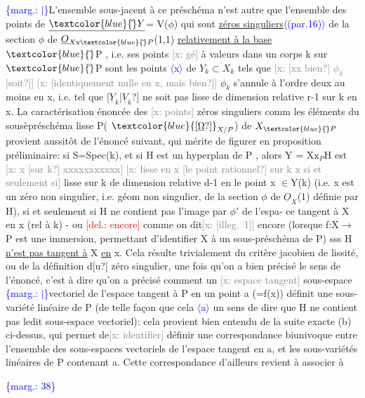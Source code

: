 \documentclass[11pt]{article}
\newcommand{\scanpage}[1]{\par\bigskip\noindent{\small\sffamily[scan #1]}\par}
\newcommand{\mspage}[1]{{\small\sffamily[p.\,#1]}}
\newcommand{\hand}[1]{\textcolor{blue}{#1}}
\newcommand{\inserted}[2][]{\textcolor{blue}{$\langle$#2$\rangle$}}
\newcommand{\margin}[1]{\textcolor{blue}{\{\textsf{marg.:} #1\}}}
\newcommand{\deleted}[1]{\textcolor{red}{[\textsf{del.:} #1]}}
\newcommand{\xout}[1]{\textcolor{gray}{[\textsf{x:} #1]}}
\newcommand{\uline}[1]{\underline{#1}}
\newcommand{\unsure}[1]{[#1?]}
\newcommand{\illegible}[1]{[\textsf{illeg.\ #1}]}
\begin{document}
\margin{$|$}L'ensemble sous-jacent à ce préschéma n'est autre que l'ensemble des
points de $\underline{\hand{\check{}}Y}$= V($\phi$) qui sont \uline{zéros singuliers}\inserted{(par.16)} de la section $\phi$ de
$\underline{O}_{X\mathrm{x}\hand{\check{}}P}$(1,1) \uline{relativement à la base} $\hand{\check{}}$P , i.e. ses points \xout{gé} à valeurs dans
un corps k sur $\hand{\check{}}$P sont les points \inserted{x} de $Y_k\subset X_k$ tels que \xout{\unsure{xx bien} $\phi_k$ \unsure{soit}}
\xout{\unsure{identiquement nulle en x, mais bien}} $\phi_k$ s'annule à l'ordre deux au moins
en x, i.e. tel que \unsure{$\underline{Y}_k$|$\underline{V}_k$} ne soit pas lisse de dimension relative r-1
sur k en x. La caractérisation énoncée des \xout{points} zéros singuliers comm
les éléments du sousèpréschéma lisse P( $\hand{\unsure{\underline{\Omega}}}_{X/P}$) de $X_{\hand{\check{}}P}$ provient aussitôt
de l'énoncé suivant, qui mérite de figurer en proposition préliminaire:
si S=Spec(k), et si H est un hyperplan de P , alors Y = X$\mathrm{x}_P$H est
\xout{x \unsure{sur k} xxxxxxxxxxx}
\xout{lisse en x \unsure{le point rationnel} sur k x si et seulement si} lisse sur k de
dimension relative d-1 en le point x $\in$Y(k) (i.e. x est un zéro non
singulier, i.e. géom non singulier, de la section $\phi$ de $\underline{O}_X$(1) définie
par H), si et seulement si H ne contient pas l'image par $\phi'$ de l'espa-%
ce tangent à X en x (rel à k) - ou \deleted{encore} comme on dit\xout{\illegible{1}} encore
(lorsque f:X$\longrightarrow$P est une immersion, permettant d'identifier X à un
sous-préschéma de P) sss H \uline{n'est pas tangent à} X \uline{en} x. Cela résulte
trivialement du critère jacobien de lissité, ou de la définition d\unsure{u}
zéro singulier, une fois qu'on a bien précisé le sens de l'énoncé,
c'est à dire qu'on a précisé comment un \xout{espace tangent} sous-espace
\margin{$|$}vectoriel de l'espace tangent à P en un point a (=f(x)) définit une
sous-variété linéaire de P (de telle façon que cela \inserted{a} un sens de dire
que H ne contient pas ledit sous-espace vectoriel): cela provient
bien entendu de la suite exacte (b) ci-dessus, qui permet de\xout{identifier}
définir une correspondance biunivoque entre l'ensemble des sous-espaces
vectoriels de l'espace tangent en a, et les sous-variétés linéaires de
P contenant a. Cette correspondance d'ailleurs revient à associer à

\margin{38}

\clearpage
\scanpage{25/39}
\mspage{\hand{\unsure{35|33}}}
\end{document}
